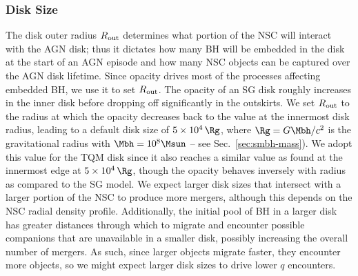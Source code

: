 \subsubsection{Disk Size}
The disk outer radius $R_{\rm out}$ determines what portion of the NSC will interact with the AGN disk; thus it dictates how many BH will be embedded in the disk at the start of an AGN episode and how many NSC objects can be captured over the AGN disk lifetime.
Since opacity drives most of the processes affecting embedded BH, we use it to set $R_{\rm out}$.
The opacity of an SG disk roughly increases in the inner disk before dropping off significantly in the outskirts.
We set $R_{\rm out}$ to the radius at which the opacity decreases back to the value at the innermost disk radius, leading to a default disk size of $5\times10^4\,\Rg$, where $\Rg = G\Mbh/c^2$ is the gravitational radius with $\Mbh=10^{8}\Msun$ -- see Sec.~\ref{sec:smbh-mass}).
We adopt this value for the TQM disk since it also reaches a similar value as found at the innermost edge at $5\times10^4\,\Rg$, though the opacity behaves inversely with radius as compared to the SG model.
We expect larger disk sizes that intersect with a larger portion of the NSC to produce more mergers, although this depends on the NSC radial density profile.
Additionally, the initial pool of BH in a larger disk has greater distances through which to migrate and encounter possible companions that are unavailable in a smaller disk, possibly increasing the overall number of mergers.
As such, since larger objects migrate faster, they encounter more objects, so we might expect larger disk sizes to drive lower $q$ encounters.

